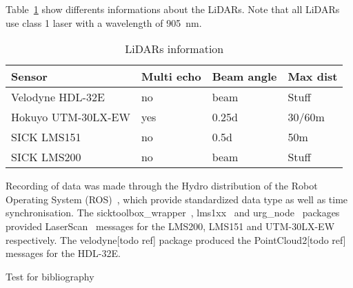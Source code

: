 Table~\ref{tab:lidars} show differents informations about the LiDARs. Note that all LiDARs use class 1 laser with a wavelength of \SI{905}{\nano\meter}.
\begin{table}[htbp]
    \centering
    \begin{tabularx}{\linewidth}{|X||X|X|X|}\hline
        Sensor              & Multi echo & Beam angle & Max dist     \\ \hline%
        Velodyne HDL-32E    & no         & beam       & Stuff        \\ \hline
        Hokuyo UTM-30LX-EW  & yes        & 0.25d      & 30/60m       \\ \hline%
        SICK LMS151         & no         & 0.5d       & 50m          \\ \hline%
        SICK LMS200         & no         & beam       & Stuff        \\ \hline
    \end{tabularx}
    \caption{LiDARs information}\label{tab:lidars}
\end{table}

Recording of data was made through the Hydro distribution of the Robot Operating System (ROS)~\cite{ROSWeb}, which provide standardized data type as well as time synchronisation. The sicktoolbox\_wrapper~\cite{LMS200Web}, lms1xx~\cite{LMS151Web} and urg\_node~\cite{HokuyoWeb} packages provided LaserScan~\cite{LaserScan} messages for the LMS200, LMS151 and UTM-30LX-EW respectively. The velodyne[todo ref] package produced the PointCloud2[todo ref] messages for the HDL-32E.

Test for bibliography~\cite{Mader2014}
